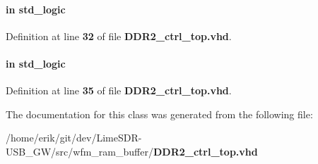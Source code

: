 \paragraph[{wcmd\+\_\+reset\+\_\+n}]{ {\bfseries \textcolor{keywordflow}{in}\textcolor{vhdlchar}{ }} {\bfseries \textcolor{comment}{std\+\_\+logic}\textcolor{vhdlchar}{ }} \hspace{0.3cm}{\ttfamily [Port]}}\label{classDDR2__ctrl__top_aac7e87fea52e3113a81259b78798028c}


Definition at line {\bf 32} of file {\bf D\+D\+R2\+\_\+ctrl\+\_\+top.\+vhd}.

\paragraph[{wcmd\+\_\+wr}]{ {\bfseries \textcolor{keywordflow}{in}\textcolor{vhdlchar}{ }} {\bfseries \textcolor{comment}{std\+\_\+logic}\textcolor{vhdlchar}{ }} \hspace{0.3cm}{\ttfamily [Port]}}\label{classDDR2__ctrl__top_a9e27cee37daee6e41d7af8263ce14a72}


Definition at line {\bf 35} of file {\bf D\+D\+R2\+\_\+ctrl\+\_\+top.\+vhd}.



The documentation for this class was generated from the following file\+:\begin{DoxyCompactItemize}
\item 
/home/erik/git/dev/\+Lime\+S\+D\+R-\/\+U\+S\+B\+\_\+\+G\+W/src/wfm\+\_\+ram\+\_\+buffer/{\bf D\+D\+R2\+\_\+ctrl\+\_\+top.\+vhd}\end{DoxyCompactItemize}
